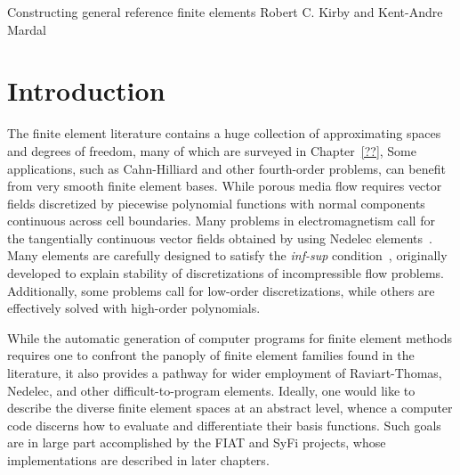 \newtheorem{definition}{Definition}[section]
\newtheorem{proposition}{Proposition}[section]
\newtheorem{example}{Example}[section]
\newtheorem{remark}{Remark}[section]

\newcommand{\mathbfx}[1]{{\mbox{\boldmath $#1$}}}
\newcommand{\R}{{\mathbb R}}
\renewcommand{\P}{{\mathbb P}}
\renewcommand{\H}{{\mathbb H}}
\newcommand{\xxi}{\mathbfx{\xi}}
\newcommand{\xx}{\mathbf{x}}
\newcommand{\ee}{\mathbf{e}}
\newcommand{\GG}{\mathbf{G}}
\newcommand{\kentc}[1]{\marginpar{\tiny KAM: #1}}
\newcommand{\rckc}[1]{\marginpar{\tiny RCK: #1}}




              {Constructing general reference finite elements}
              {Robert C. Kirby and Kent-Andre Mardal}

%



\section{Introduction}
The finite element literature contains a huge collection of
approximating spaces and degrees of freedom, many of which are
surveyed in Chapter~\ref{??}, 
Some applications, such as Cahn-Hilliard and
other fourth-order problems, can benefit from very smooth finite
element bases.  While porous media flow requires
vector fields discretized by piecewise polynomial functions with
normal components continuous across cell boundaries.  Many problems in 
electromagnetism call for the tangentially continuous vector fields obtained
by using Nedelec elements~\cite{Nedelec80,Nedelec86}.  Many elements are carefully designed
to satisfy the \emph{inf-sup} condition~\cite{BrezziFortin91,GiraultRaviart86},
originally developed to explain stability of discretizations of 
incompressible flow problems.  Additionally, some problems call for low-order
discretizations, while others are effectively solved with high-order
polynomials. 

While the automatic generation of computer programs for finite element
methods requires one to confront the panoply of  finite
element families found in the literature, it also provides a pathway
for wider employment of Raviart-Thomas, Nedelec, and other
difficult-to-program elements.  
Ideally, one would like to
describe the diverse finite element spaces at an abstract level,
whence a computer code discerns how to evaluate and differentiate
their basis functions.  Such goals are in large part accomplished by
the FIAT and SyFi projects, whose implementations are described in
later chapters.  

